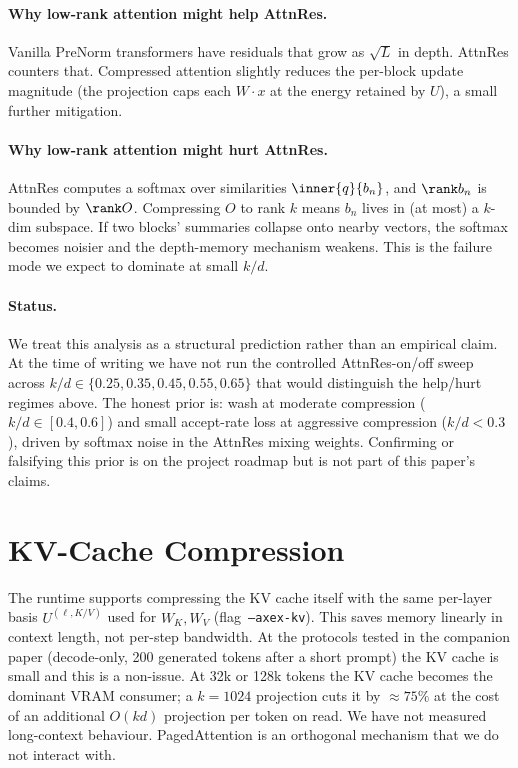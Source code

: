 \documentclass[11pt]{article}
\begin{document}
\paragraph{Why low-rank attention might help AttnRes.}
Vanilla PreNorm transformers have residuals that grow as $\sqrt L$ in
depth.  AttnRes counters that.  Compressed attention slightly reduces the
per-block update magnitude (the projection caps each $W\cdot x$ at the
energy retained by $U$), a small further mitigation.

\paragraph{Why low-rank attention might hurt AttnRes.}
AttnRes computes a softmax over similarities $\inner{q}{b_n}$, and
$\rank b_n$ is bounded by $\rank O$.  Compressing $O$ to rank $k$ means
$b_n$ lives in (at most) a $k$-dim subspace.  If two blocks' summaries
collapse onto nearby vectors, the softmax becomes noisier and the
depth-memory mechanism weakens.  This is the failure mode we expect to
dominate at small $k/d$.

\paragraph{Status.}  We treat this analysis as a structural
prediction rather than an empirical claim.  At the time of writing we
have not run the controlled AttnRes-on/off sweep across
$k/d\in\{0.25,0.35,0.45,0.55,0.65\}$ that would distinguish the
help/hurt regimes above.  The honest prior is: wash at moderate
compression ($k/d\in[0.4,0.6]$) and small accept-rate loss at aggressive
compression ($k/d<0.3$), driven by softmax noise in the AttnRes mixing
weights.  Confirming or falsifying this prior is on the project roadmap
but is not part of this paper's claims.

\section{KV-Cache Compression}
The runtime supports compressing the KV cache itself with the same
per-layer basis $U^{(\ell,K/V)}$ used for $W_K,W_V$
(flag~\texttt{--axex-kv}).  This saves memory linearly in context length,
not per-step bandwidth.  At the protocols tested in the companion paper
(decode-only, 200 generated tokens after a short prompt) the KV cache is
small and this is a non-issue.  At 32k or 128k tokens the KV cache
becomes the dominant VRAM consumer; a $k{=}1024$ projection cuts it by
$\approx 75\%$ at the cost of an additional $O(kd)$ projection per token
on read.  We have not measured long-context behaviour.  PagedAttention
\cite{kwon2023vllm} is an orthogonal mechanism that we do not interact
with.
\end{document}
